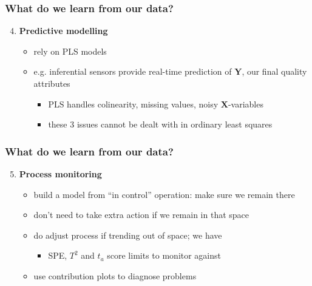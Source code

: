 \documentclass[handout, 12pt]{beamer}
\begin{document}
\begin{frame}\frametitle{What do we learn from our data?}

\begin{enumerate}
	\setcounter{enumi}{3}
	\item {\bf \color{myGreen}Predictive modelling} 
	\begin{itemize}
		\item 	rely on PLS models
		\item 	e.g. inferential sensors provide real-time prediction of \( \mathbf{Y} \), our final quality attributes
		\begin{itemize}
			\item 	PLS handles colinearity, missing values, noisy \( \mathbf{X} \)-variables
			\item 	these 3 issues cannot be dealt with in ordinary least squares
		\end{itemize}
	\end{itemize}	
\end{enumerate}
\end{frame}

\begin{frame}\frametitle{What do we learn from our data?}

\begin{enumerate}
	\setcounter{enumi}{4}
	\item {\bf \color{myGreen}Process monitoring} 
	\begin{itemize}
		\item 	build a model from ``in control'' operation: make sure we remain there
		\item 	don't need to take extra action if we remain in that space
		\item 	do adjust process if trending out of space; we have
		\begin{itemize}
			\item 	SPE, \( T^2 \) and \( t_a \) score limits to monitor against
		\end{itemize}
		
		\item 	use contribution plots to diagnose problems
	\end{itemize}	
\end{enumerate}
\end{frame}
\end{document}
